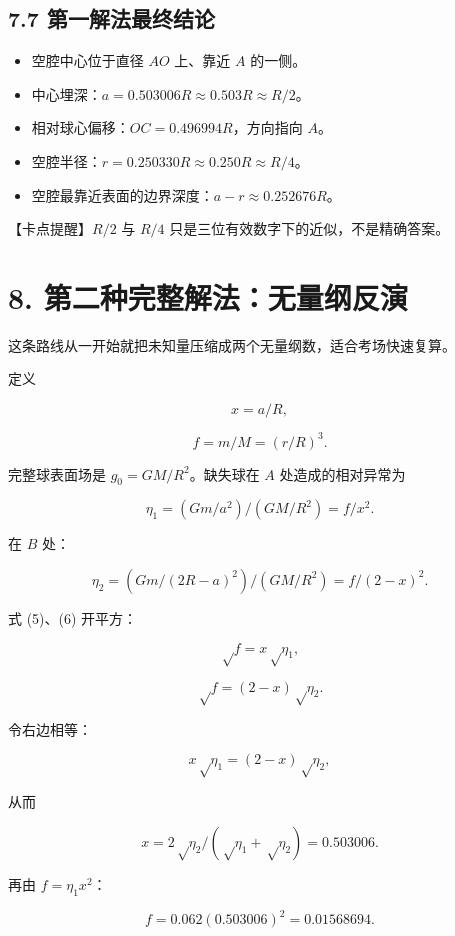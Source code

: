 \documentclass[
  11pt,
  UTF8]{ctexart}
\providecommand{\tightlist}{%
  \setlength{\itemsep}{0pt}\setlength{\parskip}{0pt}}
\begin{document}
\hypertarget{ux7b2cux4e00ux89e3ux6cd5ux6700ux7ec8ux7ed3ux8bba}{%
\subsection{7.7
第一解法最终结论}\label{ux7b2cux4e00ux89e3ux6cd5ux6700ux7ec8ux7ed3ux8bba}}

\begin{itemize}
\tightlist
\item
  空腔中心位于直径 \(AO\) 上、靠近 \(A\) 的一侧。
\item
  中心埋深：\(a=0.503006R≈0.503R≈R/2\)。
\item
  相对球心偏移：\(OC=0.496994R\)，方向指向 \(A\)。
\item
  空腔半径：\(r=0.250330R≈0.250R≈R/4\)。
\item
  空腔最靠近表面的边界深度：\(a-r≈0.252676R\)。
\end{itemize}

【卡点提醒】\(R/2\) 与 \(R/4\) 只是三位有效数字下的近似，不是精确答案。

\hypertarget{ux7b2cux4e8cux79cdux5b8cux6574ux89e3ux6cd5ux65e0ux91cfux7eb2ux53cdux6f14}{%
\section{8.
第二种完整解法：无量纲反演}\label{ux7b2cux4e8cux79cdux5b8cux6574ux89e3ux6cd5ux65e0ux91cfux7eb2ux53cdux6f14}}

这条路线从一开始就把未知量压缩成两个无量纲数，适合考场快速复算。

定义

\[x=a/R,\]

\[f=m/M=(r/R)^3.\]

完整球表面场是 \(g_0=GM/R^2\)。缺失球在 \(A\) 处造成的相对异常为

\[η_1=(Gm/a^2)/(GM/R^2)=f/x^2. \tag{5}\]

在 \(B\) 处：

\[η_2=(Gm/(2R-a)^2)/(GM/R^2)=f/(2-x)^2. \tag{6}\]

式 (5)、(6) 开平方：

\[√f=x√η_1,\]

\[√f=(2-x)√η_2.\]

令右边相等：

\[x√η_1=(2-x)√η_2,\]

从而

\[x=2√η_2/(√η_1+√η_2)=0.503006.\]

再由 \(f=η_1x^2\)：

\[f=0.062(0.503006)^2=0.01568694.\]
\end{document}
